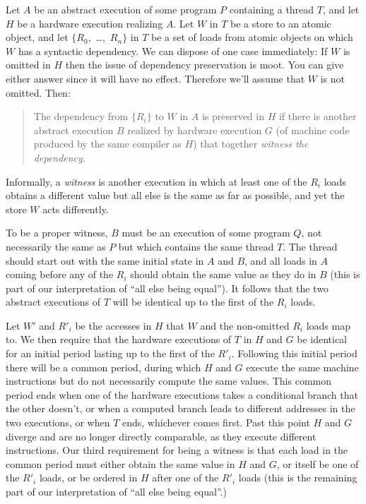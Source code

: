 Let $A$ be an abstract execution of some program $P$ containing a
thread $T$, and let $H$ be a hardware execution realizing $A$.
Let $W$ in $T$ be a store to an atomic object, and let $\{R_0,$
\ldots,~$R_n\}$ in $T$ be a set of loads from atomic objects on which
$W$ has a syntactic dependency.
We can dispose of one case immediately: If $W$ is omitted in $H$ then
the issue of dependency preservation is moot.
You can give either answer since it will have no effect.
Therefore we'll assume that $W$ is not omitted.
Then:
\begin{quote}
The dependency from $\{R_i\}$ to $W$ in $A$ is preserved in $H$
if there is another
abstract execution $B$ realized by hardware execution $G$
(of machine code produced by the same compiler as $H$)
that together \emph{witness the dependency}.
\end{quote}

Informally, a \emph{witness} is another execution in which
at least one of the $R_i$ loads obtains a different value but all else is the
same as far as possible, and yet the store $W$ acts differently.

To be a proper witness, $B$ must be an execution of some program $Q$,
not necessarily the same as $P$ but which contains the same thread $T$.
The thread should start out with the same initial state in $A$ and
$B$, and all loads in $A$ coming before any of the $R_i$ should obtain
the same value as they do in $B$ (this is part of our interpretation
of ``all else being equal'').
It follows that the two abstract executions of $T$ will be identical
up to the first of the $R_i$ loads.

Let $W'$ and $R'_i$ be the accesses in $H$ that $W$ and the
non-omitted $R_i$ loads map to.
We then require that the hardware executions of $T$ in $H$ and $G$ be
identical for an initial period lasting up to the first of the $R'_i$.
Following this initial period there will be a common period, during
which $H$ and $G$ execute the same machine instructions but do not
necessarily compute the same values.
This common period ends when one of the hardware executions
takes a conditional branch that the other doesn't, or when a computed
branch leads to different addresses in the two executions, or when $T$
ends, whichever comes first.
Past this point $H$ and $G$ diverge and are no longer directly
comparable, as they execute different instructions.
Our third requirement for being a witness is that each load in the
common period must either obtain the same value in $H$ and $G$, or
itself be one of the $R'_i$ loads, or be ordered in $H$
after one of the $R'_i$ loads (this is the remaining part of our
interpretation of ``all else being equal''.)

